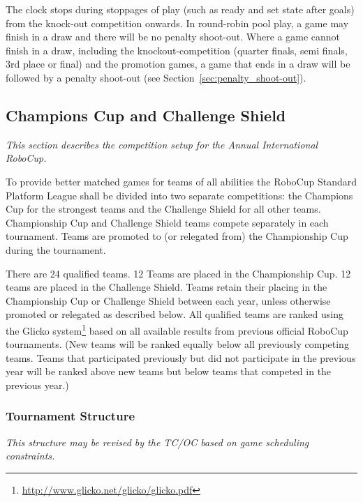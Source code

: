 The clock stops during stoppages of play (such as ready and set state after goals) from the knock-out competition onwards.  In round-robin pool play, a game may finish in a draw and there will be no penalty shoot-out. Where a game cannot finish in a draw, including the knockout-competition (quarter finals, semi finals, 3rd place or final) and the promotion games, a game that ends in a draw will be followed by a penalty shoot-out (see Section~\ref{sec:penalty_shoot-out}).

\subsection{Champions Cup and Challenge Shield}
\label{sec:twoCompetitions}
\emph{This section describes the competition setup for the Annual International RoboCup.}

To provide better matched games for teams of all abilities the RoboCup Standard Platform League shall be divided into two separate competitions: the Champions Cup for the strongest teams and the Challenge Shield for all other teams. Championship Cup and Challenge Shield teams compete separately in each tournament. Teams are promoted to (or relegated from) the Championship Cup during the tournament. 

There are 24 qualified teams. 12 Teams are placed in the Championship Cup. 12 teams are placed in the Challenge Shield. Teams retain their placing in the Championship Cup or Challenge Shield between each year, unless otherwise promoted or relegated as described below. 
All qualified teams are ranked using the Glicko system\footnote{\url{http://www.glicko.net/glicko/glicko.pdf}} based on all available results from previous official RoboCup tournaments. (New teams will be ranked equally below all previously competing teams. Teams that participated previously but did not participate in the previous year will be ranked above new teams but below teams that competed in the previous year.)

\subsubsection{Tournament Structure}
\emph{This structure may be revised by the TC/OC based on game scheduling constraints.} 

